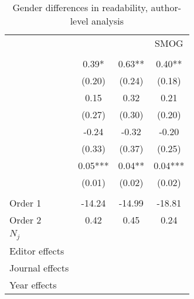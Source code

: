 \begin{table}
    \footnotesize
    \centering
    \begin{threeparttable}
        \caption{Gender differences in readability, author-level analysis}
        \label{table5APPENDIX1}
        \begin{tabular}{p{4cm}S@{}S@{}S@{}}
            \toprule
            &{}&{}&{SMOG}\\\\
            \midrule
            &        0.39*  &        0.63** &        0.40** \\
                                          &      (0.20)   &      (0.24)   &      (0.18)   \\
            &        0.15   &        0.32   &        0.21   \\
                                          &      (0.27)   &      (0.30)   &      (0.20)   \\
             &       -0.24   &       -0.32   &       -0.20   \\
                                          &      (0.33)   &      (0.37)   &      (0.25)   \\
                        &        0.05***&        0.04** &        0.04***\\
                                          &      (0.01)   &      (0.02)   &      (0.02)   \\
             \\
            Order 1&      -14.24   &      -14.99   &      -18.81   \\
            Order 2                       &        0.42   &        0.45   &        0.24   \\
            \midrule
            \(N_j\)              &           {}   &           {}   &           {}   \\
            Editor effects                &           {}   &           {}   &           {}   \\
            Journal effects               &           {}   &           {}   &           {}   \\
            Year effects                  &           {}   &           {}   &           {}   \\

\end{tabular}
\end{threeparttable}
\end{table}
